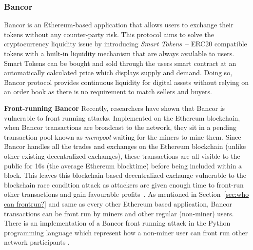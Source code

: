 




\subsubsection{Bancor} %

Bancor is an Ethereum-based application that allows users to exchange their tokens without any counter-party risk. This protocol aims to solve the cryptocurrency liquidity issue by introducing \textit{Smart Tokens}~\cite{hertzog2017bancor}-- ERC20 compatible tokens with a built-in liquidity mechanism that are always available to users. Smart Tokens can be bought and sold through the users smart contract at an automatically calculated price which displays supply and demand. Doing so, Bancor protocol provides continuous liquidity for digital assets without relying on an order book as there is no requirement to match sellers and buyers.

\par\noindent\textbf{Front-running Bancor} Recently, researchers have shown that Bancor is vulnerable to front running attacks. Implemented on the Ethereum blockchain, when Bancor transactions are broadcast to the network, they sit in a pending transaction pool known as \textit{mempool} waiting for the miners to mine them. Since Bancor handles all the trades and exchanges on the Ethereum blockchain (unlike other existing decentralized exchanges), these transactions are all visible to the public for 16s (the average Ethereum blocktime) before being included within a block. This leaves this blockchain-based decentralized exchange vulnerable to the blockchain race condition attack as attackers are given enough time to front-run other transactions and gain favourable profits~\cite{BancorIs7:online}. As mentioned in Section~\ref{sec:who can frontrun?} and same as every other Ethereum based application, Bancor transactions can be front run by miners and other regular (non-miner) users. There is an implementation of a Bancor front running attack in the Python programming language which represent how a non-miner user can front run other network participants \cite{NewTab13:online}.




